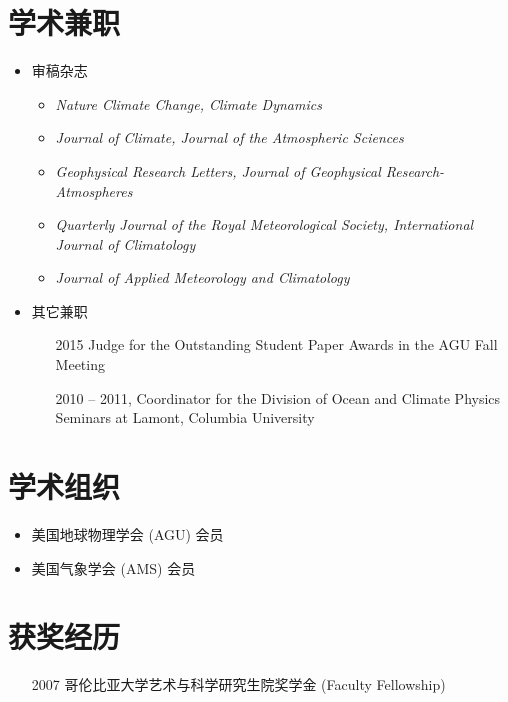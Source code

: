 \documentclass[11pt]{article}
\begin{document}
\begin{CJK*}{UTF8}{gkai}
\begin{itemize}[leftmargin=10ex,label={},noitemsep,nolistsep]
\end{itemize}


\section{学术兼职} 
\begin{itemize}[leftmargin=4ex,label={},noitemsep,nolistsep]
	\item 审稿杂志
    	\begin{itemize}[leftmargin=4ex,label={},noitemsep,nolistsep]
	\item \textit{Nature Climate Change, Climate Dynamics}
    	\item \textit{Journal of Climate, Journal of the Atmospheric Sciences}
	\item \textit{Geophysical Research Letters, Journal of Geophysical Research-Atmospheres}
	\item \textit{Quarterly Journal of the Royal Meteorological Society, International Journal of Climatology}
	\item \textit{Journal of Applied Meteorology and Climatology}	
    	\end{itemize}
	
	\item 其它兼职
	\begin{itemize}[leftmargin=10ex,label={},noitemsep,nolistsep]
		\item[2015] Judge for the Outstanding Student Paper Awards in the AGU Fall Meeting
		\item[2010]-- 2011, Coordinator for the Division of Ocean and Climate Physics Seminars at Lamont, Columbia University
	\end{itemize}
\end{itemize}
	

\section{学术组织}
\begin{itemize}[leftmargin=4ex,label={},noitemsep,nolistsep]
	\item 美国地球物理学会 (AGU) 会员 
	\item 美国气象学会 (AMS) 会员
\end{itemize}


\section{获奖经历}
\begin{itemize}[leftmargin=10ex,label={},noitemsep,nolistsep]
	\item[2007] 哥伦比亚大学艺术与科学研究生院奖学金 (Faculty Fellowship)
	

\end{itemize}
\end{CJK*}
\end{document}
